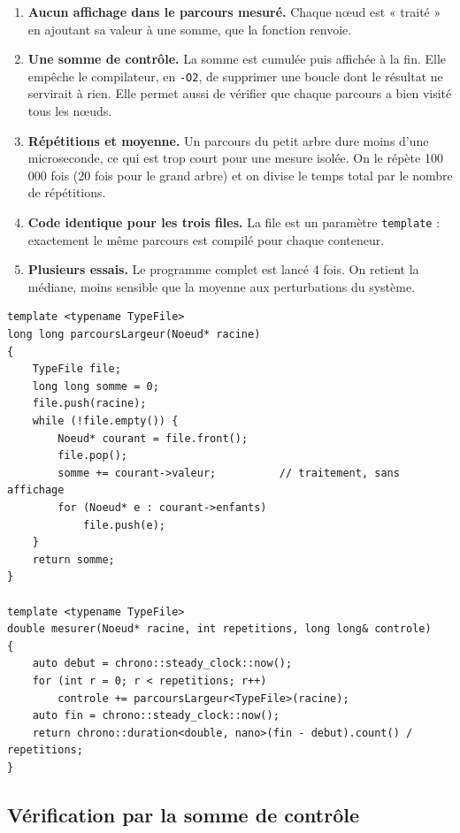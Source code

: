 \documentclass[11pt,a4paper]{article}
\begin{document}
\begin{enumerate}
  \item \textbf{Aucun affichage dans le parcours mesuré.} Chaque nœud est « traité » en
        ajoutant sa valeur à une somme, que la fonction renvoie.
  \item \textbf{Une somme de contrôle.} La somme est cumulée puis affichée à la fin. Elle empêche
        le compilateur, en \texttt{-O2}, de supprimer une boucle dont le résultat ne
        servirait à rien. Elle permet aussi de vérifier que chaque parcours a bien visité tous les nœuds.
  \item \textbf{Répétitions et moyenne.} Un parcours du petit arbre dure moins d'une microseconde,
        ce qui est trop court pour une mesure isolée. On le répète 100\,000 fois (20 fois pour le
        grand arbre) et on divise le temps total par le nombre de répétitions.
  \item \textbf{Code identique pour les trois files.} La file est un paramètre \texttt{template} :
        exactement le même parcours est compilé pour chaque conteneur.
  \item \textbf{Plusieurs essais.} Le programme complet est lancé 4 fois. On retient la médiane,
        moins sensible que la moyenne aux perturbations du système.
\end{enumerate}

\begin{lstlisting}
template <typename TypeFile>
long long parcoursLargeur(Noeud* racine)
{
    TypeFile file;
    long long somme = 0;
    file.push(racine);
    while (!file.empty()) {
        Noeud* courant = file.front();
        file.pop();
        somme += courant->valeur;          // traitement, sans affichage
        for (Noeud* e : courant->enfants)
            file.push(e);
    }
    return somme;
}

template <typename TypeFile>
double mesurer(Noeud* racine, int repetitions, long long& controle)
{
    auto debut = chrono::steady_clock::now();
    for (int r = 0; r < repetitions; r++)
        controle += parcoursLargeur<TypeFile>(racine);
    auto fin = chrono::steady_clock::now();
    return chrono::duration<double, nano>(fin - debut).count() / repetitions;
}
\end{lstlisting}

\subsection{Vérification par la somme de contrôle}
\end{document}
